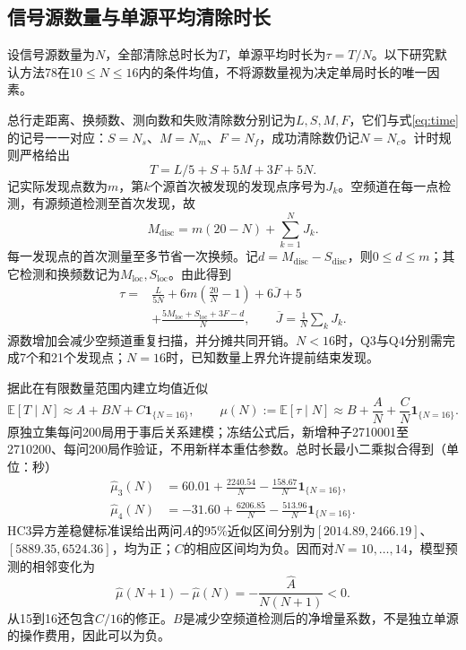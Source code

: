 ﻿%
\subsection{信号源数量与单源平均清除时长}
设信号源数量为$N$，全部清除总时长为$T$，单源平均时长为$\tau=T/N$。以下研究默认方法78在$10\le N\le16$内的条件均值，不将源数量视为决定单局时长的唯一因素。

总行走距离、换频数、测向数和失败清除数分别记为$L,S,M,F$，它们与式\eqref{eq:time}的记号一一对应：$S=N_s$、$M=N_m$、$F=N_f$，成功清除数仍记$N=N_c$。计时规则严格给出
\begin{equation}T=L/5+S+5M+3F+5N.\end{equation}
记实际发现点数为$m$，第$k$个源首次被发现的发现点序号为$J_k$。空频道在每一点检测，有源频道检测至首次发现，故
\begin{equation}M_{\mathrm{disc}}=m(20-N)+\sum_{k=1}^N J_k.\end{equation}
每一发现点的首次测量至多节省一次换频。记$d=M_{\mathrm{disc}}-S_{\mathrm{disc}}$，则$0\le d\le m$；其它检测和换频数记为$M_{\mathrm{loc}},S_{\mathrm{loc}}$。由此得到
\begin{equation}\begin{aligned}
\tau={}&\frac{L}{5N}+6m\left(\frac{20}{N}-1\right)+6\overline J+5\\
&+\frac{5M_{\mathrm{loc}}+S_{\mathrm{loc}}+3F-d}{N},\qquad \overline J=\frac1N\sum_kJ_k.
\end{aligned}\end{equation}
源数增加会减少空频道重复扫描，并分摊共同开销。$N<16$时，Q3与Q4分别需完成7个和21个发现点；$N=16$时，已知数量上界允许提前结束发现。

据此在有限数量范围内建立均值近似
\begin{equation}
\mathbb E[T\mid N]\approx A+BN+C\mathbf1_{\{N=16\}},\qquad
\mu(N):=\mathbb E[\tau\mid N]\approx B+\frac A N+\frac C N\mathbf1_{\{N=16\}}.
\end{equation}
原独立集每问200局用于事后关系建模；冻结公式后，新增种子2710001至2710200、每问200局作验证，不用新样本重估参数。总时长最小二乘拟合得到（单位：秒）
\begin{align}
\widehat\mu_3(N)&=60.01+\frac{2240.54}{N}-\frac{158.67}{N}\mathbf1_{\{N=16\}},\\
\widehat\mu_4(N)&=-31.60+\frac{6206.85}{N}-\frac{513.96}{N}\mathbf1_{\{N=16\}}.
\end{align}
HC3异方差稳健标准误给出两问$A$的95\%近似区间分别为$[2014.89,2466.19]$、$[5889.35,6524.36]$，均为正；$C$的相应区间均为负。因而对$N=10,\ldots,14$，模型预测的相邻变化为
\begin{equation}\widehat\mu(N+1)-\widehat\mu(N)=-\frac{\widehat A}{N(N+1)}<0.\end{equation}
从15到16还包含$\widehat C/16$的修正。$B$是减少空频道检测后的净增量系数，不是独立单源的操作费用，因此可以为负。

